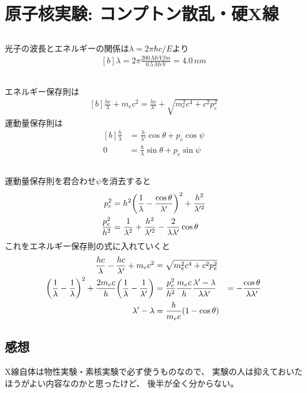 \documentclass[../../sp_2014.tex]{subfiles}
\begin{document}
\section{原子核実験: コンプトン散乱・硬X線}
\subsection{}
光子の波長とエネルギーの関係は\(\lambda = 2\pi\hbar c/E\)より
\begin{equation}\begin{aligned}[b]
    \lambda = 2\pi \frac{200\,\si{MeV fm}}{0.5\,\si{MeV}}= 4.0\,\si{nm}
\end{aligned}\end{equation}

\subsection{}
エネルギー保存則は
\begin{equation}\begin{aligned}[b]
    \frac{hc}{\lambda}+m_ec^2 = \frac{hc}{\lambda'}+\sqrt{m_e^2c^4+c^2p_e^2}
\end{aligned}\end{equation}
運動量保存則は
\begin{equation}\begin{aligned}[b]
    \frac{h}{\lambda} &= \frac{h}{\lambda'}\cos\theta + p_e\cos\psi\\
    0&= \frac{h}{\lambda}\sin\theta + p_e \sin\psi
\end{aligned}\end{equation}

\subsection{}
運動量保存則を君合わせ\(\psi\)を消去すると
\begin{equation}\begin{aligned}[b]
    p_e^2&=h^2\qty(\frac{1}{\lambda}-\frac{\cos\theta}{\lambda'})^2 + \frac{h^2}{\lambda'^2}\\
    \frac{p_e^2}{h^2}&= \frac{1}{\lambda^2}+\frac{h^2}{\lambda'^2}-\frac{2}{\lambda\lambda'}\cos\theta
\end{aligned}\end{equation}
これをエネルギー保存則の式に入れていくと
\begin{equation}\begin{aligned}[b]
    \frac{hc}{\lambda}-\frac{hc}{\lambda'}+m_ec^2 &= \sqrt{m_e^2c^4+c^2p_e^2}\\
    \qty(\frac{1}{\lambda}-\frac{1}{\lambda})^2+\frac{2m_ec}{h}\qty(\frac{1}{\lambda}-\frac{1}{\lambda'})&= \frac{p_e^2}{h^2}
    \frac{m_e c}{h}\frac{\lambda'-\lambda}{\lambda\lambda'}&=-\frac{\cos\theta}{\lambda\lambda'}\\
    \lambda'-\lambda &= \frac{h}{m_ec}(1-\cos\theta)
\end{aligned}\end{equation}


\subsection*{感想}
X線自体は物性実験・素核実験で必ず使うものなので、
実験の人は抑えておいたほうがよい内容なのかと思ったけど、
後半が全く分からない。
\end{document}

